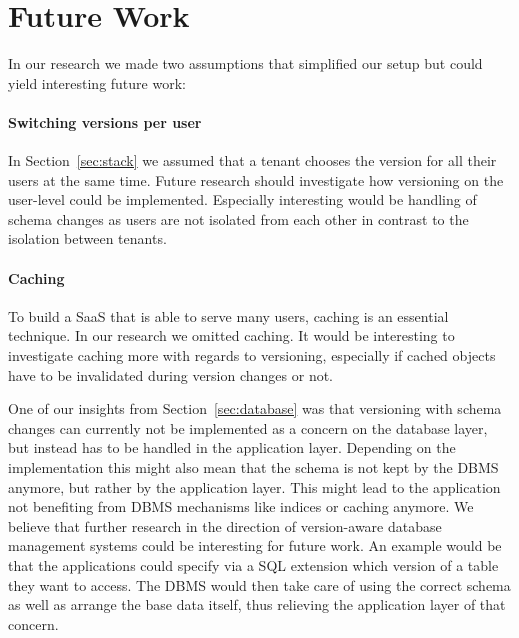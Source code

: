 
\section{Future Work}
\label{sec:futurework}

In our research we made two assumptions that simplified our setup but could yield interesting future work:

\paragraph{Switching versions per user} In Section~\ref{sec:stack} we assumed that a tenant chooses the version for all their users at the same time. Future research should investigate how versioning on the user-level could be implemented. Especially interesting would be handling of schema changes as users are not isolated from each other in contrast to the isolation between tenants.

\paragraph{Caching} To build a SaaS that is able to serve many users, caching is an essential technique. In our research we omitted caching. It would be interesting to investigate caching more with regards to versioning, especially if cached objects have to be invalidated during version changes or not.

\vspace{\baselineskip}
\noindent One of our insights from Section~\ref{sec:database} was that versioning with schema changes can currently not be implemented as a concern on the database layer, but instead has to be handled in the application layer. Depending on the implementation this might also mean that the schema is not kept by the DBMS anymore, but rather by the application layer. This might lead to the application not benefiting from DBMS mechanisms like indices or caching anymore. We believe that further research in the direction of version-aware database management systems could be interesting for future work. An example would be that the applications could specify via a SQL extension which version of a table they want to access. The DBMS would then take care of using the correct schema as well as arrange the base data itself, thus relieving the application layer of that concern.
